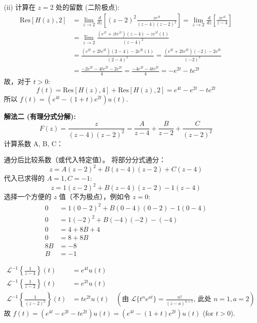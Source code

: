 \documentclass[linespread=1.5,openany]{book}%
\def\diff{d}%
\theoremstyle{plain}
\newcommand{\diff}{\mathop{}\!\mathrm{d}}  %
\begin{document}
{{{{{{{									(ii) 计算在 $z=2$ 处的留数 (二阶极点):
									\begin{align*}
										\text{Res}[H(z), 2] &= \lim_{z\to 2} \frac{\diff}{\diff z} \left[ (z-2)^2 \frac{z e^{zt}}{(z-4)(z-2)^2} \right] = \lim_{z\to 2} \frac{\diff}{\diff z} \left[ \frac{z e^{zt}}{z-4} \right] \\[6pt]
										&= \lim_{z\to 2} \frac{(e^{zt}+zte^{zt})(z-4) - ze^{zt}(1)}{(z-4)^2} \\[6pt]
										&= \frac{(e^{2t}+2te^{2t})(2-4) - 2e^{2t}(1)}{(2-4)^2} = \frac{(e^{2t}+2te^{2t})(-2) - 2e^{2t}}{(-2)^2} \\[6pt]
										&= \frac{-2e^{2t}-4te^{2t} - 2e^{2t}}{4} = \frac{-4e^{2t}-4te^{2t}}{4} = -e^{2t}-te^{2t}
									\end{align*}
									故，对于 $t>0$:
									\[ f(t) = \text{Res}[H(z), 4] + \text{Res}[H(z), 2] = e^{4t} - e^{2t} - te^{2t} \]
									所以 $f(t) = (e^{4t} - (1+t)e^{2t})u(t)$.
									
									\vspace{\baselineskip}
									
									\noindent\textbf{解法二 (有理分式分解):} \\
									\[ F(z) = \frac{z}{(z-4)(z-2)^2} = \frac{A}{z-4} + \frac{B}{z-2} + \frac{C}{(z-2)^2} \]
									计算系数 A, B, C：
									
									通分后比较系数（或代入特定值）。
									将部分分式通分：
									\[ z = A(z-2)^2 + B(z-4)(z-2) + C(z-4) \]
									代入已求得的 $A=1, C=-1$:
									\[ z = 1(z-2)^2 + B(z-4)(z-2) - 1(z-4) \]
									选择一个方便的 $z$ 值（不为极点），例如令 $z=0$:
									\begin{align*}
										0 &= 1(0-2)^2 + B(0-4)(0-2) - 1(0-4) \\[6pt]
										0 &= 1(-2)^2 + B(-4)(-2) - (-4) \\[6pt]
										0 &= 4 + 8B + 4 \\[6pt]
										0 &= 8 + 8B \\[6pt]
										8B &= -8 \\[6pt]
										B &= -1
									\end{align*}
									
									
									
									\begin{align*}
										\mathcal{L}^{-1}\left\{\frac{1}{z-4}\right\}(t) &= e^{4t}u(t) \\[6pt]
										\mathcal{L}^{-1}\left\{\frac{1}{z-2}\right\}(t) &= e^{2t}u(t) \\[6pt]
										\mathcal{L}^{-1}\left\{\frac{1}{(z-2)^2}\right\}(t) &= te^{2t}u(t) \quad (\text{由 } \mathcal{L}\{t^n e^{at}\} = \frac{n!}{(z-a)^{n+1}} \text{, 此处 } n=1, a=2)
									\end{align*}
									故 $f(t) = (e^{4t} - e^{2t} - te^{2t})u(t) = (e^{4t} - (1+t)e^{2t})u(t)$ (for $t>0$).
									\vspace{\baselineskip}
									
}}}}}}}
\end{document}
